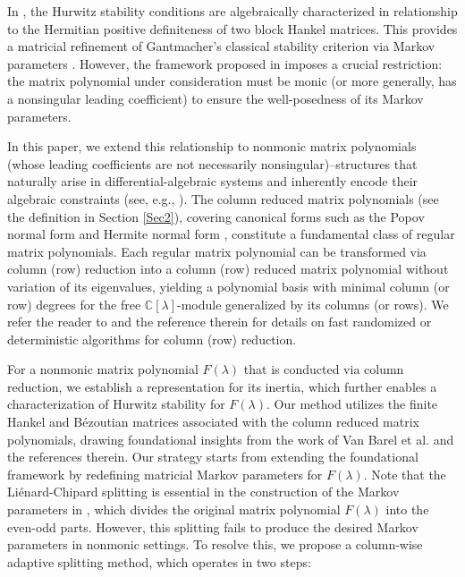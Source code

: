 \documentclass[12pt,reqno]{amsart}
\theoremstyle{plain}
\numberwithin{equation}{section}
\theoremstyle{remark}
\begin{document}
In \cite{XD}, the Hurwitz stability conditions are algebraically characterized in relationship to the Hermitian positive definiteness of two block Hankel matrices.
This provides a matricial refinement of Gantmacher's classical stability criterion via Markov parameters \cite[Theorem 17, Chapter XV]{Gan}. 
However, the framework proposed in \cite{XD} imposes a crucial restriction: the matrix polynomial under consideration must be monic (or more generally, has a nonsingular leading coefficient) to ensure the well-posedness of its Markov parameters. 

In this paper, we extend this relationship to nonmonic matrix polynomials (whose leading coefficients are not necessarily nonsingular)--structures that naturally arise in differential-algebraic systems and inherently encode their algebraic constraints (see, e.g., \cite{KM}). 
The column reduced matrix polynomials (see the definition in Section \ref{Sec2}), covering canonical forms such as the Popov normal form \cite{Popov} and Hermite normal form \cite{Hermite}, constitute a fundamental class of regular matrix polynomials.
Each regular matrix polynomial can be transformed via column (row) reduction into a column (row) reduced matrix polynomial without variation of its eigenvalues,
yielding
a polynomial basis with minimal column (or row) degrees for the free $\mathbb C[\lambda]$-module generalized by its columns (or rows). We refer the reader to \cite{GJV,LNZ,NRS} and the reference therein for details on fast randomized or deterministic algorithms for column (row) reduction. 


For a nonmonic matrix polynomial $F(\lambda)$ that is conducted via column reduction, we establish a representation for its inertia, which further enables a characterization of Hurwitz stability for $F(\lambda)$. Our method utilizes the finite Hankel and B\'ezoutian matrices associated with the column reduced matrix polynomials, drawing foundational insights from the work of Van Barel et al.
\cite{BPV} and the references therein.  
Our strategy starts from extending the foundational framework by redefining‌ matricial Markov parameters‌ for $F(\lambda)$‌.  Note that the Li\'{e}nard-Chipard splitting is essential in the construction of the Markov parameters in \cite{XD}, which divides the original matrix polynomial $F(\lambda)$ into the even-odd parts. However, this splitting fails to produce the desired Markov parameters in nonmonic settings. 
To resolve this, we propose a ‌column-wise adaptive splitting method, which operates in two steps:
\end{document}
